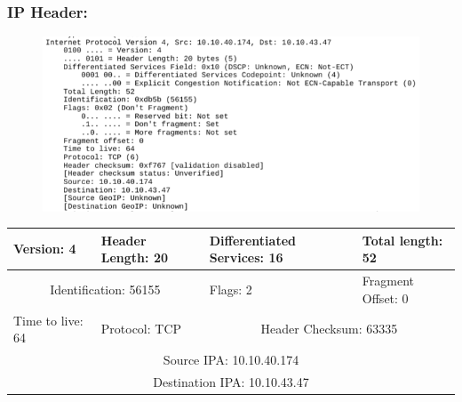 \documentclass[]{report}
\begin{document}
\subsubsection{IP Header: }
\begin{figure}[H]
	\vspace{0pt}
	\includegraphics[width=600pt, keepaspectratio, center]{Snapshots/exe6/ip.png}
\end{figure}
\begin{tabular}{ |p{3cm}|p{3cm}|p{3cm}|p{3cm}|  }
	\hline
	Version: 4 & Header Length: 20 & Differentiated Services: 16  & Total length: 52 \\
	\hline
	\multicolumn{2}{|c|}{Identification: 56155} & Flags: 2 & Fragment Offset: 0 \\
	\hline
	Time to live: 64 & Protocol: TCP & \multicolumn{2}{|c|}{Header Checksum: 63335} \\
	\hline
	\multicolumn{4}{|c|}{Source IPA: 10.10.40.174} \\
	\hline
	\multicolumn{4}{|c|}{Destination IPA: 10.10.43.47} \\
	\hline 
\end{tabular}
\end{document}
